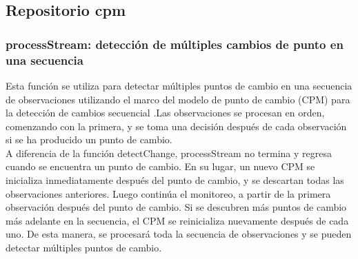 \documentclass[runningheads,a4paper,12pt]{report}
\begin{document}
\newpage

\subsection{Repositorio cpm \cite{cpm}}
\subsubsection{processStream: detección de múltiples cambios de punto en una secuencia}
Esta función se utiliza para detectar múltiples puntos de cambio en una secuencia de observaciones utilizando el marco del modelo de punto de cambio (CPM) para la detección de cambios secuencial .Las observaciones se procesan en orden, comenzando con la primera, y se toma una decisión después de cada observación si se ha producido un punto de cambio.\\

A diferencia de la función detectChange, processStream no termina y regresa cuando se encuentra un punto de cambio. En su lugar, un nuevo CPM se inicializa inmediatamente después del punto de cambio, y se descartan todas las observaciones anteriores. Luego continúa el monitoreo, a partir de la primera observación después del punto de cambio. Si se descubren más puntos de cambio más adelante en la secuencia, el CPM se reinicializa nuevamente después de cada uno. De esta manera, se procesará toda la secuencia de observaciones y se pueden detectar múltiples puntos de cambio.\\
\end{document}
